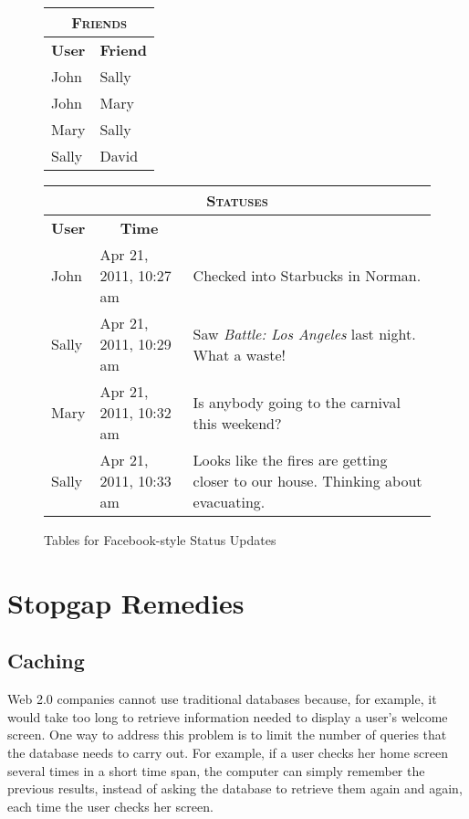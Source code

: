 \begin{figure}
	\begin{center}
		\begin{tabular}[t]{ll}
			\hline
			\multicolumn{2}{c}{\textsc{Friends}} \\
			\hline
			\multicolumn{1}{c}{\textbf{User}} & \multicolumn{1}{c}{\textbf{Friend}} \\
			\hline
			John  & Sally \\
			John  & Mary \\
			Mary  & Sally \\
			Sally & David \\
			\hline
		\end{tabular}
		\hspace{.5in}
		\begin{tabular}[t]{ll>{\raggedright}p{1in}}
			\hline
			\multicolumn{3}{c}{\textsc{Statuses}} \\
			\hline
			\multicolumn{1}{c}{\textbf{User}} & \multicolumn{1}{c}{\textbf{Time}} & \multicolumn{1}{c}{\textbf{Status}} \\
			\hline
			John  & Apr 21, 2011, 10:27 am & Checked into Starbucks in Norman. \tabularnewline
			Sally & Apr 21, 2011, 10:29 am & Saw \emph{Battle: Los Angeles} last night.  What a waste! \tabularnewline
			Mary  & Apr 21, 2011, 10:32 am & Is anybody going to the carnival this weekend? \tabularnewline
			Sally & Apr 21, 2011, 10:33 am & Looks like the fires are getting closer to our house.  Thinking about evacuating. \tabularnewline
			\hline
		\end{tabular}
	\end{center}
	\caption{Tables for Facebook-style Status Updates}
	\label{facebook-tables}
\end{figure}

\section{Stopgap Remedies}

\subsection{Caching}

Web 2.0 companies cannot use traditional databases
because, for example, it would take too long to retrieve information needed 
to display a user's welcome screen.
One way to address this problem is to limit the number of queries that the
database needs to carry out.
For example, if a user checks her home screen several times in a short time span,
the computer can simply remember the previous results, instead of asking the database to
retrieve them again and again, each time the user checks her screen.

